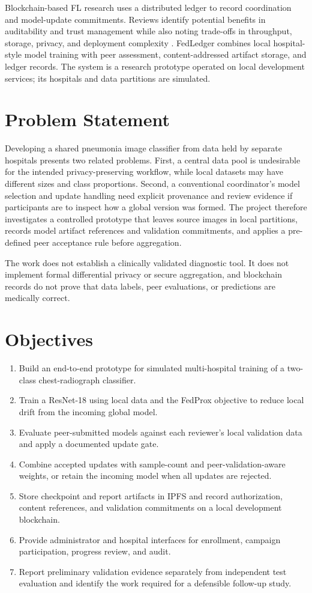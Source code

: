 \documentclass[12pt,a4paper]{report}
\begin{document}
Blockchain-based FL research uses a distributed ledger to record coordination and model-update commitments. Reviews identify potential benefits in auditability and trust management while also noting trade-offs in throughput, storage, privacy, and deployment complexity \cite{wang2026bcfl,zhu2023blockfed}. FedLedger combines local hospital-style model training with peer assessment, content-addressed artifact storage, and ledger records. The system is a research prototype operated on local development services; its hospitals and data partitions are simulated.

\section{Problem Statement}
Developing a shared pneumonia image classifier from data held by separate hospitals presents two related problems. First, a central data pool is undesirable for the intended privacy-preserving workflow, while local datasets may have different sizes and class proportions. Second, a conventional coordinator's model selection and update handling need explicit provenance and review evidence if participants are to inspect how a global version was formed. The project therefore investigates a controlled prototype that leaves source images in local partitions, records model artifact references and validation commitments, and applies a pre-defined peer acceptance rule before aggregation.

The work does not establish a clinically validated diagnostic tool. It does not implement formal differential privacy or secure aggregation, and blockchain records do not prove that data labels, peer evaluations, or predictions are medically correct.

\section{Objectives}
\begin{enumerate}
    \item Build an end-to-end prototype for simulated multi-hospital training of a two-class chest-radiograph classifier.
    \item Train a ResNet-18 using local data and the FedProx objective to reduce local drift from the incoming global model.
    \item Evaluate peer-submitted models against each reviewer's local validation data and apply a documented update gate.
    \item Combine accepted updates with sample-count and peer-validation-aware weights, or retain the incoming model when all updates are rejected.
    \item Store checkpoint and report artifacts in IPFS and record authorization, content references, and validation commitments on a local development blockchain.
    \item Provide administrator and hospital interfaces for enrollment, campaign participation, progress review, and audit.
    \item Report preliminary validation evidence separately from independent test evaluation and identify the work required for a defensible follow-up study.
\end{enumerate}
\end{document}
